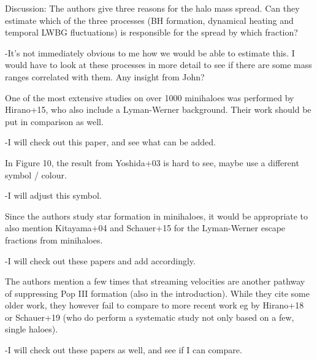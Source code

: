 \documentclass[11pt]{article}
\begin{document}
\begin{referee}
Discussion:
The authors give three reasons for the halo mass spread. Can they estimate which of the three processes (BH formation, dynamical heating and temporal LWBG fluctuations) is responsible for the spread by which fraction?
\end{referee}
-It's not immediately obvious to me how we would be able to estimate this. I would have to look at these processes in more detail to see if there are some mass ranges correlated with them. Any insight from John?

\begin{referee}
One of the most extensive studies on over 1000 minihaloes was performed by Hirano+15, who also include a Lyman-Werner background. Their work should be put in comparison as well.
\end{referee}
-I will check out this paper, and see what can be added.

\begin{referee}
In Figure 10, the result from Yoshida+03 is hard to see, maybe use a different symbol / colour.
\end{referee}
-I will adjust this symbol.

\begin{referee}
Since the authors study star formation in minihaloes, it would be appropriate to also mention Kitayama+04 and Schauer+15 for the Lyman-Werner escape fractions from minihaloes.
\end{referee}
-I will check out these papers and add accordingly.

\begin{referee}
The authors mention a few times that streaming velocities are another pathway of suppressing Pop III formation (also in the introduction). While they cite some older work, they however fail to compare to more recent work eg by Hirano+18 or Schauer+19 (who do perform a systematic study not only based on a few, single haloes).
\end{referee}
-I will check out these papers as well, and see if I can compare. 
\end{document}
